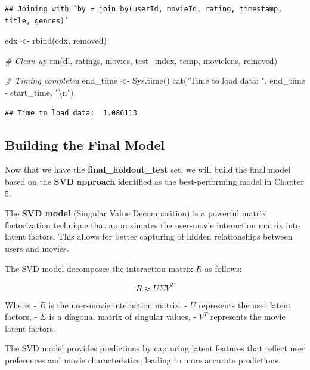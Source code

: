 \documentclass[
]{article}
\newenvironment{Shaded}{}{}
\newcommand{\CommentTok}[1]{\textcolor[rgb]{0.38,0.63,0.69}{\textit{#1}}}
\newcommand{\FunctionTok}[1]{\textcolor[rgb]{0.02,0.16,0.49}{#1}}
\newcommand{\NormalTok}[1]{#1}
\newcommand{\OtherTok}[1]{\textcolor[rgb]{0.00,0.44,0.13}{#1}}
\newcommand{\SpecialCharTok}[1]{\textcolor[rgb]{0.25,0.44,0.63}{#1}}
\newcommand{\StringTok}[1]{\textcolor[rgb]{0.25,0.44,0.63}{#1}}
\begin{document}
\begin{verbatim}
## Joining with `by = join_by(userId, movieId, rating, timestamp, title, genres)`
\end{verbatim}

\begin{Shaded}
\begin{Highlighting}[]
\NormalTok{edx }\OtherTok{\textless{}{-}} \FunctionTok{rbind}\NormalTok{(edx, removed)}

\CommentTok{\# Clean up}
\FunctionTok{rm}\NormalTok{(dl, ratings, movies, test\_index, temp, movielens, removed)}

\CommentTok{\# Timing completed}
\NormalTok{end\_time }\OtherTok{\textless{}{-}} \FunctionTok{Sys.time}\NormalTok{()}
\FunctionTok{cat}\NormalTok{(}\StringTok{"Time to load data: "}\NormalTok{, end\_time }\SpecialCharTok{{-}}\NormalTok{ start\_time, }\StringTok{"}\SpecialCharTok{\textbackslash{}n}\StringTok{"}\NormalTok{)}
\end{Highlighting}
\end{Shaded}

\begin{verbatim}
## Time to load data:  1.086113
\end{verbatim}

\subsection{Building the Final Model}\label{building-the-final-model}

Now that we have the \textbf{final\_holdout\_test} set, we will build
the final model based on the \textbf{SVD approach} identified as the
best-performing model in Chapter 5.

The \textbf{SVD model} (Singular Value Decomposition) is a powerful
matrix factorization technique that approximates the user-movie
interaction matrix into latent factors. This allows for better capturing
of hidden relationships between users and movies.

The SVD model decomposes the interaction matrix \(R\) as follows:

\[
R \approx U \Sigma V^T
\]

Where: - \(R\) is the user-movie interaction matrix, - \(U\) represents
the user latent factors, - \(\Sigma\) is a diagonal matrix of singular
values, - \(V^T\) represents the movie latent factors.

The SVD model provides predictions by capturing latent features that
reflect user preferences and movie characteristics, leading to more
accurate predictions.
\end{document}
